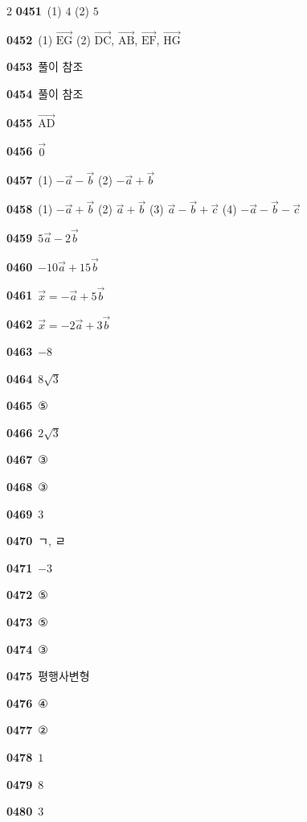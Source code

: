\documentclass[10pt,a4paper]{article}
\newcommand{\pt}[1]{\mathrm{#1}}
\begin{document}
\begin{multicols}{2}
\noindent\textbf{0451}\ (1) $4$ \quad (2) $5$\par
\noindent\textbf{0452}\ (1) $\overrightarrow{\pt{EG}}$ \quad (2) $\overrightarrow{\pt{DC}}$, $\overrightarrow{\pt{AB}}$, $\overrightarrow{\pt{EF}}$, $\overrightarrow{\pt{HG}}$\par
\noindent\textbf{0453}\ 풀이 참조\par
\noindent\textbf{0454}\ 풀이 참조\par
\noindent\textbf{0455}\ $\overrightarrow{\pt{AD}}$\par
\noindent\textbf{0456}\ $\vec{0}$\par
\noindent\textbf{0457}\ (1) $-\vec{a}-\vec{b}$ \quad (2) $-\vec{a}+\vec{b}$\par
\noindent\textbf{0458}\ (1) $-\vec{a}+\vec{b}$ \quad (2) $\vec{a}+\vec{b}$ \quad (3) $\vec{a}-\vec{b}+\vec{c}$ \quad (4) $-\vec{a}-\vec{b}-\vec{c}$\par
\noindent\textbf{0459}\ $5\vec{a}-2\vec{b}$\par
\noindent\textbf{0460}\ $-10\vec{a}+15\vec{b}$\par
\noindent\textbf{0461}\ $\vec{x}=-\vec{a}+5\vec{b}$\par
\noindent\textbf{0462}\ $\vec{x}=-2\vec{a}+3\vec{b}$\par
\noindent\textbf{0463}\ $-8$\par
\noindent\textbf{0464}\ $8\sqrt{3}$\par
\noindent\textbf{0465}\ ⑤\par
\noindent\textbf{0466}\ $2\sqrt{3}$\par
\noindent\textbf{0467}\ ③\par
\noindent\textbf{0468}\ ③\par
\noindent\textbf{0469}\ $3$\par
\noindent\textbf{0470}\ ㄱ, ㄹ\par
\noindent\textbf{0471}\ $-3$\par
\noindent\textbf{0472}\ ⑤\par
\noindent\textbf{0473}\ ⑤\par
\noindent\textbf{0474}\ ③\par
\noindent\textbf{0475}\ 평행사변형\par
\noindent\textbf{0476}\ ④\par
\noindent\textbf{0477}\ ②\par
\noindent\textbf{0478}\ $1$\par
\noindent\textbf{0479}\ $8$\par
\noindent\textbf{0480}\ $3$\par

\end{multicols}
\end{document}
